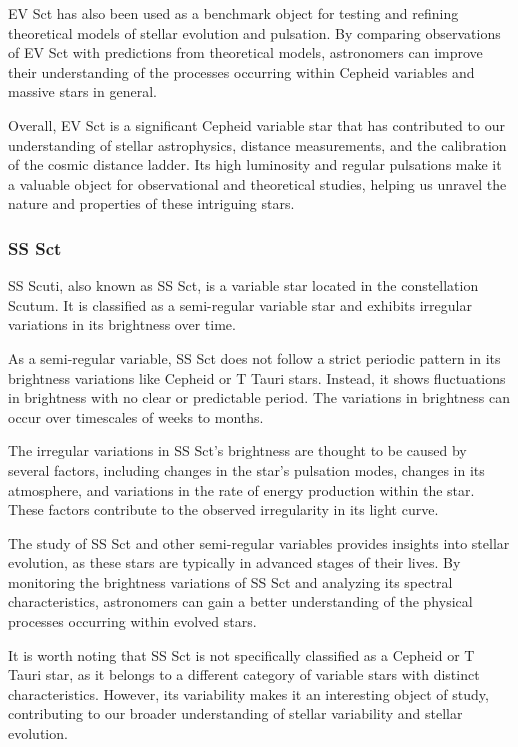 EV Sct has also been used as a benchmark object for testing and refining theoretical models of stellar evolution and pulsation. By comparing observations of EV Sct with predictions from theoretical models, astronomers can improve their understanding of the processes occurring within Cepheid variables and massive stars in general.

Overall, EV Sct is a significant Cepheid variable star that has contributed to our understanding of stellar astrophysics, distance measurements, and the calibration of the cosmic distance ladder. Its high luminosity and regular pulsations make it a valuable object for observational and theoretical studies, helping us unravel the nature and properties of these intriguing stars.

\subsubsection*{ SS Sct }
SS Scuti, also known as SS Sct, is a variable star located in the constellation Scutum. It is classified as a semi-regular variable star and exhibits irregular variations in its brightness over time.

As a semi-regular variable, SS Sct does not follow a strict periodic pattern in its brightness variations like Cepheid or T Tauri stars. Instead, it shows fluctuations in brightness with no clear or predictable period. The variations in brightness can occur over timescales of weeks to months.

The irregular variations in SS Sct's brightness are thought to be caused by several factors, including changes in the star's pulsation modes, changes in its atmosphere, and variations in the rate of energy production within the star. These factors contribute to the observed irregularity in its light curve.

The study of SS Sct and other semi-regular variables provides insights into stellar evolution, as these stars are typically in advanced stages of their lives. By monitoring the brightness variations of SS Sct and analyzing its spectral characteristics, astronomers can gain a better understanding of the physical processes occurring within evolved stars.

It is worth noting that SS Sct is not specifically classified as a Cepheid or T Tauri star, as it belongs to a different category of variable stars with distinct characteristics. However, its variability makes it an interesting object of study, contributing to our broader understanding of stellar variability and stellar evolution.



